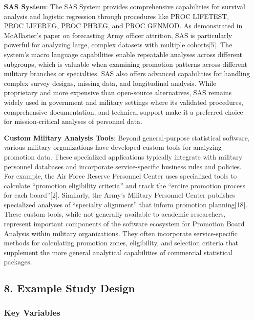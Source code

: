 \documentclass[
  letterpaper,
  DIV=11,
  numbers=noendperiod]{scrartcl}
\begin{document}
\textbf{SAS System}: The SAS System provides comprehensive capabilities
for survival analysis and logistic regression through procedures like
PROC LIFETEST, PROC LIFEREG, PROC PHREG, and PROC GENMOD. As
demonstrated in McAllaster's paper on forecasting Army officer
attrition, SAS is particularly powerful for analyzing large, complex
datasets with multiple cohorts{[}5{]}. The system's macro language
capabilities enable repeatable analyses across different subgroups,
which is valuable when examining promotion patterns across different
military branches or specialties. SAS also offers advanced capabilities
for handling complex survey designs, missing data, and longitudinal
analysis. While proprietary and more expensive than open-source
alternatives, SAS remains widely used in government and military
settings where its validated procedures, comprehensive documentation,
and technical support make it a preferred choice for mission-critical
analyses of personnel data.

\textbf{Custom Military Analysis Tools}: Beyond general-purpose
statistical software, various military organizations have developed
custom tools for analyzing promotion data. These specialized
applications typically integrate with military personnel databases and
incorporate service-specific business rules and policies. For example,
the Air Force Reserve Personnel Center uses specialized tools to
calculate ``promotion eligibility criteria'' and track the ``entire
promotion process for each board''{[}2{]}. Similarly, the Army's
Military Personnel Center publishes specialized analyses of ``specialty
alignment'' that inform promotion planning{[}18{]}. These custom tools,
while not generally available to academic researchers, represent
important components of the software ecosystem for Promotion Board
Analysis within military organizations. They often incorporate
service-specific methods for calculating promotion zones, eligibility,
and selection criteria that supplement the more general analytical
capabilities of commercial statistical packages.

\subsection{8. Example Study Design}\label{example-study-design}

\subsubsection{Key Variables}\label{key-variables}
\end{document}
